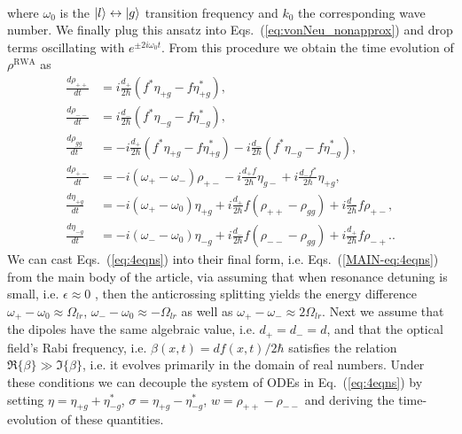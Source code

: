 \documentclass[onecolumn,secnumarabic,amssymb, nobibnotes, aip, prd]{revtex4-1}
\begin{document}
\begin{appendices}
\begin{subequations}
\begin{align}
\end{align}
\end{subequations}
where $\omega_0$ is the $\ket{l}\leftrightarrow\ket{g}$ transition frequency and $k_0$ the corresponding wave number.  We finally plug this ansatz into Eqs.~(\ref{eq:vonNeu_nonapprox}) and drop terms oscillating with $e^{\pm 2i\omega_0t}$. From this procedure we obtain the time evolution of $\rho^{\text{RWA}}$ as
\begin{subequations}
\label{eq:4eqns}
\begin{align}
\frac{d \rho_{++}}{dt} &= i\frac{d_{+}}{2\hbar}(f^*\eta_{+g}-f\eta_{+g}^*), \\
\frac{d \rho_{--}}{dt} &= i\frac{d_{-}}{2\hbar}(f^*\eta_{-g}-f\eta_{-g}^*), \\
\frac{d \rho_{gg}}{dt} &= - i\frac{d_{+}}{2\hbar}(f^*\eta_{+g}-f\eta_{+g}^*)-i\frac{d_{-}}{2\hbar}(f^*\eta_{-g}-f\eta_{-g}^*), \\
\frac{d \rho_{+-}}{dt} &= -i(\omega_+-\omega_-)\rho_{+-}-i\frac{d_{+}f}{2\hbar}\eta_{g-}+i\frac{d_{-}f^*}{2\hbar}\eta_{+g},\\
\frac{d \eta_{+g}}{dt} &= -i(\omega_+-\omega_{0})\eta_{+g}+i\frac{d_{+}}{2\hbar}f(\rho_{++}-\rho_{gg})+i\frac{d_{-}}{2\hbar}f\rho_{+-}, \label{eq:eta+g}\\
\frac{d \eta_{-g}}{dt} &= -i(\omega_--\omega_{0})\eta_{-g}+i\frac{d_{-}}{2\hbar}f(\rho_{--}-\rho_{gg})+i\frac{d_{+}}{2\hbar}f\rho_{-+}. \label{eq:eta-g}. 
\end{align}
\end{subequations}
We can cast Eqs.~(\ref{eq:4eqns}) into their final form, i.e. Eqs.~(\ref{MAIN-eq:4eqns}) from the main body of the article, via assuming that when resonance detuning is small, i.e. $\epsilon \approx  0$ , then the anticrossing splitting yields the energy difference $\omega_+-\omega_0 \approx \Omega_{lr}$, $\omega_--\omega_0\approx - \Omega_{lr}$ as well as $\omega_+-\omega_- \approx 2\Omega_{lr}$. Next we assume that the dipoles have the same algebraic value, i.e. $d_+ = d_- =d$, and that the optical field's Rabi frequency, i.e. $\beta(x,t) = df(x,t)/2\hbar $ satisfies the relation $\Re\{\beta\} \gg \Im\{\beta\}$, i.e. it evolves primarily in the domain of real numbers. 
Under these conditions we can decouple the system of ODEs in Eq.~(\ref{eq:4eqns}) by setting $\eta = \eta_{+g}+\eta_{-g}^*$, $\sigma = \eta_{+g}-\eta_{-g}^*$, $w = \rho_{++}-\rho_{--}$ and deriving the time-evolution of these quantities.


\end{appendices}
\end{document}
